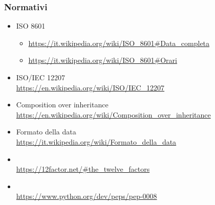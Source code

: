     \subsubsection{Normativi}	\label{rifnorma}
    \begin{itemize}
        \item ISO 8601 
        \begin{itemize}
            \item \url{https://it.wikipedia.org/wiki/ISO\_8601#Data_completa}
            \item \url{https://it.wikipedia.org/wiki/ISO\_8601#Orari}
        \end{itemize}
    	\item ISO/IEC 12207 \\\url{https://en.wikipedia.org/wiki/ISO/IEC_12207}
        \item Composition over inheritance \\\url{https://en.wikipedia.org/wiki/Composition_over_inheritance}
    	\item Formato della data \\\url{https://it.wikipedia.org/wiki/Formato\_della\_data}
        \item {}\\ %
        \url{https://12factor.net/#the_twelve_factors}
        \item {} \\\url{https://www.python.org/dev/peps/pep-0008}
    \end{itemize}

